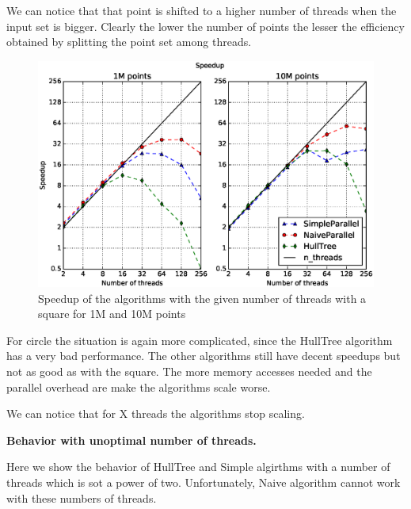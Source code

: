 \documentclass[letterpaper]{article}
\newcommand{\mypar}[1]{{\bf #1.}}
\begin{document}
We can notice that that point is shifted to a higher number of threads when the input set is bigger. Clearly the lower the number of points the lesser the efficiency obtained by splitting the point set among threads.

\begin{figure}[!ht]\centering
  \includegraphics[scale=0.33]{./plots/speedup_xeon_square_10000000.eps}
  \caption{Speedup of the algorithms with the given number of threads with a square for 1M and 10M points\label{Threads time}}
\end{figure}

For circle the situation is again more complicated, since the HullTree algorithm has a very bad performance.
The other algorithms still have decent speedups but not as good as with the square.
The more memory accesses needed and the parallel overhead are make the algorithms scale worse.



We can notice that for X threads the algorithms stop scaling.

\mypar{Behavior with unoptimal number of threads}

Here we show the behavior of HullTree and Simple algirthms with a number of threads which is sot a power of two. Unfortunately, Naive algorithm cannot work with these numbers of threads.
\end{document}
